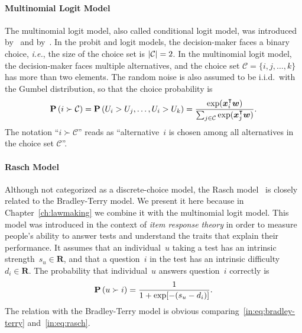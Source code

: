 \paragraph{Multinomial Logit Model}

The multinomial logit model, also called conditional logit model, was introduced by~\citet{luce1959individual} and by~\citet{mcfadden1973conditional}.
In the probit and logit models, the decision-maker faces a binary choice, \textit{i.e.}, the size of the choice set is $\lvert\mathcal{C}\rvert = 2$.
In the multinomial logit model, the decision-maker faces multiple alternatives, and the choice set $\mathcal{C} = \{ i, j, \ldots, k \}$ has more than two elements.
The random noise is also assumed to be i.i.d.\ with the Gumbel distribution, so that the choice probability is
\begin{equation}
	\label{in:eq:multinomiallogit}
	\mathbf{P}\left( i \succ \mathcal{C} \right) = \mathbf{P}\left( U_i > U_j, \ldots, U_i > U_k \right) = \frac{\exp(\bm{x}_i^\intercal \bm{w})}{\sum_{j \in \mathcal{C}} \exp(\bm{x}_j^\intercal \bm{w})}.
\end{equation}
The notation ``$i \succ \mathcal{C}$'' reads as ``alternative~$i$ is chosen among all alternatives in the choice set $\mathcal{C}$''.

\paragraph{Rasch Model}
Although not categorized as a discrete-choice model, the Rasch model~\citep{rasch1993probabilistic} is closely related to the Bradley-Terry model.
We present it here because in Chapter~\ref{ch:lawmaking} we combine it with the multinomial logit model.
This model was introduced in the context of \emph{item response theory} in order to measure people's ability to answer tests and understand the traits that explain their performance.
It assumes that an individual~$u$ taking a test has an intrinsic strength~$s_u \in \mathbf{R}$, and that a question~$i$ in the test has an intrinsic difficulty~$d_i \in \mathbf{R}$.
The probability that individual~$u$ answers question~$i$ correctly is
\begin{equation}
	\label{in:eq:rasch}
	\mathbf{P}\left( u \succ i \right) = \frac{1}{1 + \exp[-(s_u - d_i)]}.
\end{equation}
The relation with the Bradley-Terry model is obvious comparing~\eqref{in:eq:bradley-terry} and~\eqref{in:eq:rasch}.


